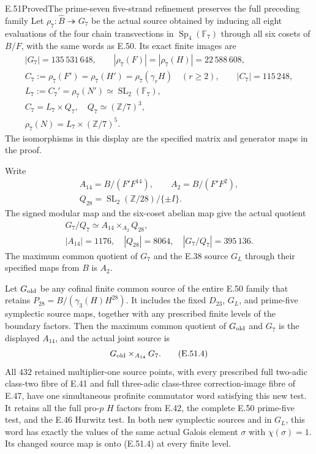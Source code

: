 \begin{statement}{E.51}{Proved}{The prime-seven five-strand refinement preserves the full preceding family}
Let $\rho_7:\widehat B\twoheadrightarrow G_7$ be the actual source
obtained by inducing all eight evaluations of the four chain
transvections in $\operatorname{Sp}_4(\mathbb F_7)$ through all six
cosets of $B/F$, with the same words as E.50.  Its exact finite
images are
\[
\begin{gathered}
 |G_7|=135\,531\,648,\qquad
 |\rho_7(F)|=|\rho_7(H)|=22\,588\,608,\\
 C_7:=\rho_7(F')=\rho_7(H')=\rho_7(\gamma_rH)
       \quad(r\ge2),\qquad |C_7|=115\,248,\\
 L_7:=C_7'=\rho_7(N')\simeq\operatorname{SL}_2(\mathbb F_7),\\
 C_7=L_7\times Q_7,\quad Q_7\simeq(\mathbb Z/7)^3,\\
 \rho_7(N)=L_7\times(\mathbb Z/7)^5.
\end{gathered}
\tag{E.51.1}
\]
The isomorphisms in this display are the specified matrix and
generator maps in the proof.

Write
\[
\begin{gathered}
 A_{14}=B/(F'F^{14}),\qquad A_2=B/(F'F^2),\\
 Q_{28}=\operatorname{SL}_2(\mathbb Z/28)/\{\pm I\}.
\end{gathered}
\tag{E.51.2}
\]
The signed modular map and the six-coset abelian map give the
actual quotient
\[
\begin{gathered}
 G_7/Q_7\simeq A_{14}\times_{A_2}Q_{28},\\
 |A_{14}|=1176,\quad |Q_{28}|=8064,\quad
 |G_7/Q_7|=395\,136.
\end{gathered}
\tag{E.51.3}
\]
The maximum common quotient of $G_7$ and the E.38 source $G_L$
through their specified maps from $B$ is $A_2$.

Let $G_{\rm old}$ be any cofinal finite common source of the
entire E.50 family that retains
$P_{28}=B/(\gamma_3(H)H^{28})$.  It includes the fixed
$D_{23}$, $G_L$, and prime-five symplectic source maps, together
with any prescribed finite levels of the boundary factors.
Then the maximum common quotient of $G_{\rm old}$ and $G_7$
is the displayed $A_{14}$, and the actual joint source is
\[
                   G_{\rm old}\times_{A_{14}}G_7.
\tag{E.51.4}
\]
All $432$ retained multiplier-one source points, with every
prescribed full two-adic class-two fibre of E.41 and full
three-adic class-three correction-image fibre of E.47, have
one simultaneous profinite commutator word satisfying this
new test.  It retains all the full pro-$p$ $H$ factors from
E.42, the complete E.50 prime-five test, and the E.46 Hurwitz
test.  In both new symplectic sources and in $G_L$, this word
has exactly the values of the same actual Galois element
$\sigma$ with $\chi(\sigma)=1$.  Its changed source map is
onto \textup{(E.51.4)} at every finite level.


\end{statement}
